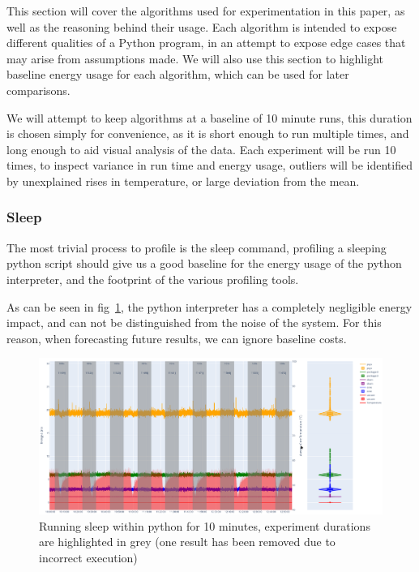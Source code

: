 This section will cover the algorithms used for experimentation in this paper, as well as the reasoning behind their
usage.
Each algorithm is intended to expose different qualities of a Python program, in an attempt to expose edge cases that
may arise from assumptions made.
We will also use this section to highlight baseline energy usage for each algorithm, which can be used for later
comparisons.

We will attempt to keep algorithms at a baseline of 10 minute runs, this duration is chosen simply for convenience, as
it is short enough to run multiple times, and long enough to aid visual analysis of the data.
Each experiment will be run 10 times, to inspect variance in run time and energy usage, outliers will be identified by
unexplained rises in temperature, or large deviation from the mean.

\subsubsection{Sleep}
The most trivial process to profile is the sleep command, profiling a sleeping python script should give us a good
baseline for the energy usage of the python interpreter, and the footprint of the various profiling tools.

As can be seen in fig~\ref{fig:sleep_repeating}, the python interpreter has a completely negligible energy impact, and
can not be distinguished from the noise of the system.
For this reason, when forecasting future results, we can ignore baseline costs.

\begin{figure}[H]
    \centering
    \includegraphics[width=15cm]{figures/implementation/sleep_repetition}
    \caption{Running sleep within python for 10 minutes, experiment durations are highlighted in grey (one result has
    been removed due to incorrect execution)}
    \label{fig:sleep_repeating}
\end{figure}

